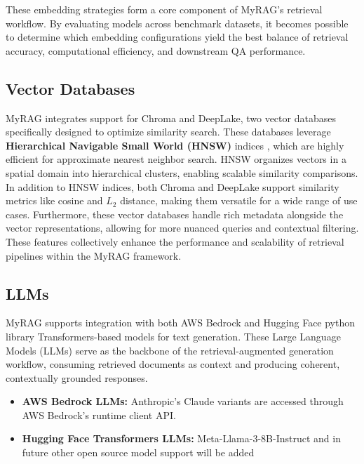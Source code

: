 \documentclass[pdflatex,sn-mathphys-num]{sn-jnl}%
\theoremstyle{thmstyleone}%
\theoremstyle{thmstyletwo}%
\theoremstyle{thmstylethree}%
\begin{document}
These embedding strategies form a core component of MyRAG's retrieval workflow. By evaluating models across benchmark datasets, it becomes possible to determine which embedding configurations yield the best balance of retrieval accuracy, computational efficiency, and downstream QA performance.

\subsection{Vector Databases}\label{subsec3.3}

MyRAG integrates support for Chroma and DeepLake, two vector databases specifically designed to optimize similarity search. These databases leverage \textbf{Hierarchical Navigable Small World (HNSW)} indices \cite{malkov2016efficient}, which are highly efficient for approximate nearest neighbor search. HNSW organizes vectors in a spatial domain into hierarchical clusters, enabling scalable similarity comparisons. In addition to HNSW indices, both Chroma and DeepLake support similarity metrics like cosine and \(L_2\) distance, making them versatile for a wide range of use cases. Furthermore, these vector databases handle rich metadata alongside the vector representations, allowing for more nuanced queries and contextual filtering. These features collectively enhance the performance and scalability of retrieval pipelines within the MyRAG framework.


\subsection{LLMs} \label{subsec3.4}
MyRAG supports integration with both AWS Bedrock and Hugging Face python library Transformers-based models for text generation. These Large Language Models (LLMs) serve as the backbone of the retrieval-augmented generation workflow, consuming retrieved documents as context and producing coherent, contextually grounded responses. 

\begin{itemize}
    \item \textbf{AWS Bedrock LLMs:} Anthropic's Claude variants are accessed through AWS Bedrock's runtime client API. 
    
    \item \textbf{Hugging Face Transformers LLMs:} Meta-Llama-3-8B-Instruct and in future other open source model support will be added
\end{itemize}
\end{document}
